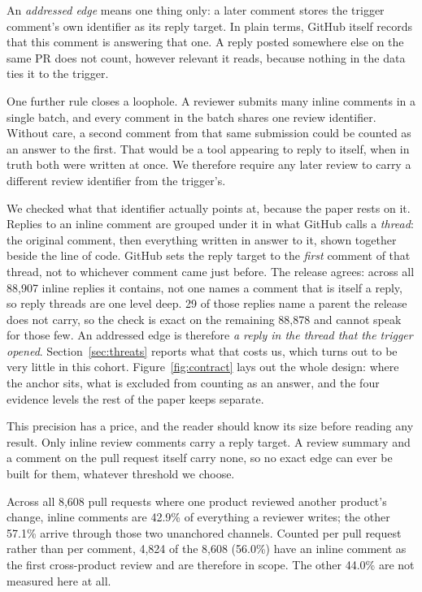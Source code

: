 \documentclass[lineno,pdflatex,sn-basic]{sn-jnl}
\begin{document}
An \emph{addressed edge} means one thing only: a later comment stores the trigger
comment's own identifier as its reply target. In plain terms, GitHub itself
records that this comment is answering that one. A reply posted somewhere else on
the same PR does not count, however relevant it reads, because nothing in the data
ties it to the trigger.

One further rule closes a loophole. A reviewer submits many inline comments in a
single batch, and every comment in the batch shares one review identifier. Without
care, a second comment from that same submission could be counted as an answer to the first. That would be a tool appearing to
reply to itself, when in truth both were written at once. We therefore require any later review to carry a different review
identifier from the trigger's.

We checked what that identifier actually points at, because the paper rests on
it. Replies to an inline comment are grouped under it in what GitHub calls a
\emph{thread}: the original comment, then everything written in answer to it,
shown together beside the line of code. GitHub sets the reply target to the
\emph{first} comment of that thread, not to whichever comment came just before. The release agrees: across all 88,907 inline replies it
contains, not one names a comment that is itself a reply, so reply threads are
one level deep. 29 of
those replies name a parent the release does not carry, so the check is exact on
the remaining 88,878 and cannot speak for
those few. An addressed edge is therefore \emph{a reply in the
thread that the trigger opened}. Section~\ref{sec:threats} reports what that costs us, which turns out to be very
little in this cohort. Figure~\ref{fig:contract} lays out the whole design: where the anchor sits, what
is excluded from counting as an answer, and the four evidence levels the rest of
the paper keeps separate.

This precision has a price, and the reader should know its size before reading
any result. Only inline review comments carry a reply target. A review summary
and a comment on the pull request itself carry none, so no exact edge can ever be
built for them, whatever threshold we choose.

Across all 8,608 pull requests where one product reviewed another product's
change, inline comments are 42.9\% of everything a reviewer writes; the other
57.1\% arrive through those two unanchored channels. Counted per pull request
rather than per comment, 4,824 of the 8,608 (56.0\%) have an inline comment as
the first cross-product review and are therefore in scope. The other 44.0\% are
not measured here at all.
\end{document}
